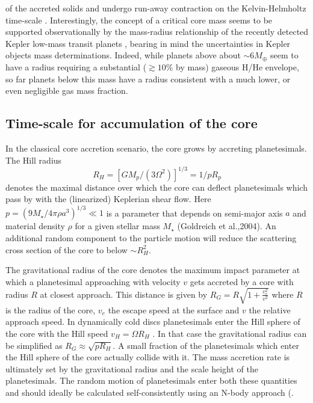 of the accreted solids and undergo run-away contraction on the Kelvin-Helmholtz time-scale \citep{Bodenheimer1986}. 
Interestingly, the concept of a critical core mass seems to be supported observationally by the mass-radius
relationship of the recently detected Kepler low-mass transit planets \citep{Lissauer2011a, Lissauer2011b, Carter2012, Ofir2013}, 
bearing in mind the uncertainties in Kepler objects mass determinations. Indeed, while planets above
about $\sim 6 M_\oplus$ seem to have a radius requiring a substantial ($\gtrsim10$\% by mass) gaseous H/He envelope, so far planets 
below this mass have a radius consistent with a much lower, or even negligible gas mass fraction. 

\subsection{Time-scale for accumulation of the core}
In the classical core accretion scenario, the core grows by accreting planetesimals. The Hill radius
\begin{equation}
R_H = [G M_p /(3 \Omega^2 )]^{1/3} = 1/p R_p
\end{equation}
denotes the maximal distance over which the core can deflect planetesimals which pass by with the (linearized) Keplerian shear flow. 
Here $p = (9M_\star /4\pi \rho a^3 )^{1/3} \ll 1$ is a parameter that depends on semi-major axis $a$ and 
material density $\rho$ for a given stellar mass $M_\star$ (Goldreich et al.,2004). An additional random 
component to the particle motion will reduce the scattering cross section of the core to below $\sim R^2_H$.

The gravitational radius of the core denotes the maximum impact parameter at which a planetesimal approaching 
with velocity $v$ gets accreted by a core with radius $R$ at closest approach. This distance is given by
$R_G = R \sqrt{1+\frac{v^2_e}{v^2}}$
where $R$ is the radius of the core, $v_e$ the escape speed at the surface and $v$ the relative approach speed. In dynamically
cold discs planetesimals enter the Hill sphere of the core with the Hill speed $v_H = ΩR_H$ . In that case the gravitational 
radius can be simplified as $R_G \approx \sqrt{p R_H}$. 
A small fraction of the planetesimals which enter the Hill sphere of the core actually collide with it. 
The mass accretion rate is ultimately set by the gravitational radius and the
scale height of the planetesimals. The random motion of planetesimals enter both these quantities and should ideally
be calculated self-consistently using an N-body approach (\cite[e.g.][]{Levison2010}.

